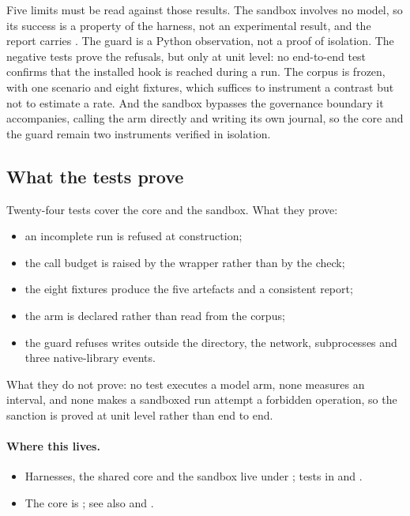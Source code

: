 Five limits must be read against those results. The sandbox involves no model, so
its success is a property of the harness, not an experimental result, and the
report carries . The guard is a Python
observation, not a proof of isolation. The negative tests prove the refusals, but
only at unit level: no end-to-end test confirms that the installed hook is reached
during a run. The corpus is frozen, with one scenario and eight fixtures, which
suffices to instrument a contrast but not to estimate a rate. And the sandbox
bypasses the governance boundary it accompanies, calling the arm directly and
writing its own journal, so the core and the guard remain two instruments verified
in isolation.

\subsection{What the tests prove}

Twenty-four tests cover the core and the sandbox. What they prove:

\begin{itemize}
\item an incomplete run is refused at construction;
\item the call budget is raised by the wrapper rather than by the check;
\item the eight fixtures produce the five artefacts and a consistent report;
\item the arm is declared rather than read from the corpus;
\item the guard refuses writes outside the directory, the network, subprocesses
and three native-library events.
\end{itemize}

What they do not prove: no test executes a model arm, none measures an interval,
and none makes a sandboxed run attempt a forbidden operation, so the sanction is
proved at unit level rather than end to end.

\paragraph{Where this lives.}
\begin{itemize}
\item Harnesses, the shared core and the sandbox live under ; tests in  and .
\item The core is ; see also  and .
\end{itemize}
